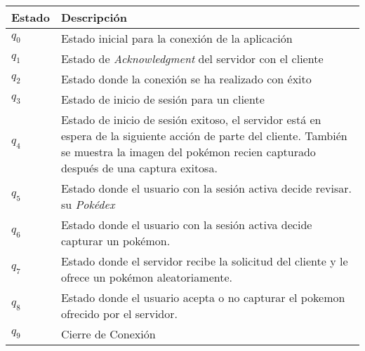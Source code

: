 \documentclass[12pt]{article}
\begin{document}
\begin{center}
\begin{tabular}{|l|p{9cm}|}
  \hline
  Estado & Descripción \\
  \hline
  $q_0$ & Estado inicial para la conexión de la aplicación \\ \hline
  $q_1$ & Estado de \textit{Acknowledgment} del servidor con el cliente \\ \hline
  $q_2$ & Estado donde la conexión se ha realizado con éxito \\ \hline
  $q_3$ & Estado de inicio de sesión para un cliente \\ \hline
  $q_4$ & Estado de inicio de sesión exitoso, el servidor está en espera de la siguiente acción de parte del cliente. También se muestra la imagen del pokémon recien capturado después de una captura exitosa. \\ \hline
  $q_5$ & Estado donde el usuario con la sesión activa decide revisar. su \textit{Pokédex} \\ \hline
  $q_6$ & Estado donde el usuario con la sesión activa decide capturar un pokémon.\\ \hline
  $q_7$ & Estado donde el servidor recibe la solicitud del cliente y le ofrece un pokémon aleatoriamente.\\ \hline
  $q_8$ & Estado donde el usuario acepta o no capturar el pokemon ofrecido por el servidor.\\ \hline
  $q_9$ & Cierre de Conexión \\
  \hline
\end{tabular}

\end{center}
\end{document}
